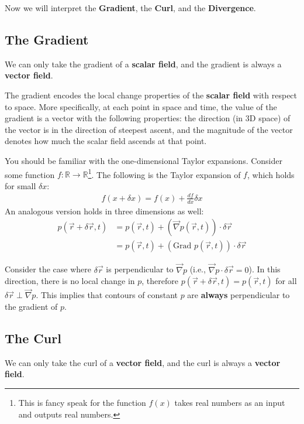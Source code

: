 Now we will interpret the \textbf{Gradient}, the \textbf{Curl}, and the \textbf{Divergence}.

\subsection{The Gradient}

We can only take the gradient of a \textbf{scalar field}, and the gradient is always a \textbf{vector field}.

The gradient encodes the local change properties of the \textbf{scalar field} with respect to space. More specifically, at each point in space and time, the value of the gradient is a vector with the following properties: the direction (in 3D space) of the vector is in the direction of steepest ascent, and the magnitude of the vector denotes how much the scalar field ascends at that point.

You should be familiar with the one-dimensional Taylor expansions. Consider some function $f: \mathbb{R} \to \mathbb{R}$\footnote{This is fancy speak for the function $f(x)$ takes real numbers as an input and outputs real numbers.}. The following is the Taylor expansion of $f$, which holds for small $\delta x$:
\begin{align*}
    f(x+\delta x)=f(x)+\frac{df}{dx}\delta x
\end{align*}
An analogous version holds in three dimensions as well:
\begin{align*}
    p(\vec{r}+\delta\vec{r},t)&=p(\vec{r},t)+\left( \vec{\nabla}p(\vec{r},t) \right)\cdot \delta\vec{r}\\
    &=p(\vec{r},t)+\left( \text{Grad }p(\vec{r},t) \right)\cdot \delta\vec{r}
\end{align*}

Consider the case where $\delta \vec{r}$ is perpendicular to $\vec{\nabla}p$ (i.e., $\vec{\nabla}p\cdot \delta \vec{r}=0$). In this direction, there is no local change in $p$, therefore $p(\vec{r}+\delta\vec{r},t)=p(\vec{r},t)$ for all $\delta\vec{r}\perp \vec{\nabla}p$. This implies that contours of constant $p$ are \textbf{always} perpendicular to the gradient of $p$. 

\subsection{The Curl}

We can only take the curl of a \textbf{vector field}, and the curl is always a \textbf{vector field}.

